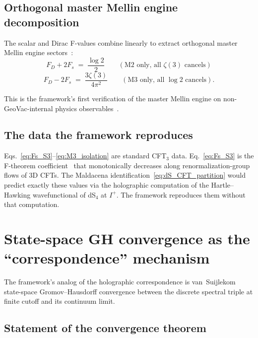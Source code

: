 \documentclass[11pt,a4paper]{article}
\theoremstyle{plain}
\theoremstyle{definition}
\begin{document}
\subsection{Orthogonal master Mellin engine decomposition}

The scalar and Dirac F-values combine linearly to extract orthogonal
master Mellin engine sectors~\cite{paper50, paper18}:
\begin{equation}
F_{D} + 2 F_{s} \;=\; \frac{\log 2}{2}
\qquad (\text{M2 only, all $\zeta(3)$ cancels})
\label{eq:M2_isolation}
\end{equation}
\begin{equation}
F_{D} - 2 F_{s} \;=\; \frac{3 \zeta(3)}{4 \pi^{2}}
\qquad (\text{M3 only, all $\log 2$ cancels}).
\label{eq:M3_isolation}
\end{equation}

This is the framework's first verification of the master Mellin engine
on non-GeoVac-internal physics observables~\cite{paper50, paper32}.

\subsection{The data the framework reproduces}

Eqs.~\eqref{eq:Fs_S3}--\eqref{eq:M3_isolation} are standard CFT$_{3}$
data. Eq.~\eqref{eq:Fs_S3} is the F-theorem
coefficient~\cite{klebanov_pufu_safdi2011} that monotonically decreases
along renormalization-group flows of 3D CFTs. The Maldacena
identification~\eqref{eq:dS_CFT_partition} would predict exactly these
values via the holographic computation of the Hartle--Hawking
wavefunctional of dS$_{4}$ at $I^{+}$. The framework reproduces them
without that computation.

\section{State-space GH convergence as the ``correspondence'' mechanism}
\label{sec:propinquity_mechanism}

The framework's analog of the holographic correspondence is
van~Suijlekom state-space Gromov--Hausdorff convergence between the
discrete spectral triple at finite cutoff and its continuum limit.

\subsection{Statement of the convergence theorem}
\end{document}
